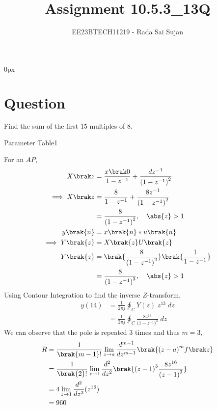 \documentclass[journal,12pt,twocolumn]{IEEEtran}
\theoremstyle{remark}
\begin{document}
\parindent 0px

\title{Assignment 10.5.3\_13Q}
\author{EE23BTECH11219 - Rada Sai Sujan$^{}$%
}
\maketitle
\newpage
\bigskip
\section*{Question}
Find the sum of the first $15$ multiples of $8$. \\
\solution
\fi

\begin{table}[ht]
    \centering
    \def\arraystretch{1.5}
    
    \caption{Parameter Table1}
    \label{tab:10.5.3.1}
\end{table}
For an $AP$,
\begin{align}
    X\brak z &= \frac{ x\brak 0 }{1-z^{-1}} + \frac{dz^{-1}}{{(1-z^{-1})}^{2}}    \\
    \implies X\brak z &= \frac{8}{1-z^{-1}} + \frac{8z^{-1}}{{(1-z^{-1})}^{2}} \\
    &= \frac{8}{({1-z^{-1})}^{2}} ,\quad \abs{z}>1    \\
    y\brak{n}&=x\brak{n}\ast u\brak{n}\\
    \implies Y\brak{z}&=X\brak{z}U\brak{z}   \\
    Y\brak{z}&=\brak{\frac{8}{({1-z^{-1})}^{2}}}\brak{\frac{1}{1-z^{-1}}}  \\
    &=\frac{8}{({1-z^{-1})}^{3}} ,\quad \abs{z}>1 
\end{align}
 Using Contour Integration to find the inverse $Z$-transform,
\begin{align}
    y(14)&=\frac{1}{2\pi j}\oint_{C}Y(z) \;z^{13} \;dz  \\
    &=\frac{1}{2\pi j}\oint_{C}\frac{8z^{13}}{({1-z^{-1})}^{3}} \;dz 
\end{align}
We can observe that the pole is repeated $3$ times and thus $m=3$,
\begin{align}
    R&=\frac{1}{\brak {m-1}!}\lim\limits_{z\to a}\frac{d^{m-1}}{dz^{m-1}}\brak {{(z-a)}^{m}f\brak z}  \\
    &=\frac{1}{\brak {2}!}\lim\limits_{z\to 1}\frac{d^{2}}{dz^{2}}\brak {{(z-1)}^{3}\frac{8z^{16}}{{(z-1)}^3}}   \\
    &=4\lim\limits_{z\to 1}\frac{d^2}{dz^2}(z^{16})   \\
    &=960
\end{align}
\end{document}
